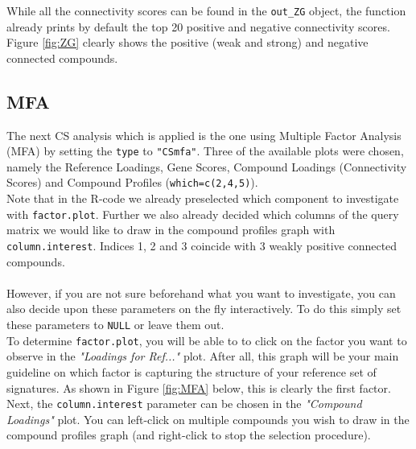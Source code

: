 \documentclass[a4paper]{article}\usepackage[]{graphicx}\usepackage[]{color}
\begin{document}
\noindent While all the connectivity scores can be found in the \texttt{out\_ZG}
object, the function already prints by default the top 20 positive and negative
connectivity scores. Figure \ref{fig:ZG} clearly shows the positive (weak and
strong) and negative connected compounds.

\subsection{MFA}
The next CS analysis which is applied is the one using Multiple Factor Analysis
(MFA) by setting the \texttt{type} to \texttt{"CSmfa"}. Three of the
available plots were chosen, namely the Reference Loadings, Gene Scores,
Compound Loadings (Connectivity Scores) and Compound Profiles
(\texttt{which=c(2,4,5)}).\\
Note that in the R-code we already preselected which component to investigate
with \texttt{factor.plot}.
Further we also already decided which columns of the query matrix we would like
to draw in the compound profiles graph with \texttt{column.interest}. Indices 1, 2 and 3 coincide
with 3 weakly positive connected compounds.\\ \\
However, if you are not sure beforehand what you want to investigate, you can
also decide upon these parameters on the fly interactively. To do this simply
set these parameters to \texttt{NULL} or leave them out.\\
To determine \texttt{factor.plot}, you will be able to to click on the factor
you want to observe in the {\it "Loadings for Ref..."} plot. After all, this graph will be
your main guideline on which factor is capturing the structure of your reference
set of signatures. As shown in Figure \ref{fig:MFA} below, this is clearly the
first factor. \\
Next, the \texttt{column.interest} parameter can be chosen in the {\it "Compound
Loadings"} plot. You can left-click on multiple compounds you wish to draw in
the compound profiles graph (and right-click to stop the selection procedure). 
\end{document}
